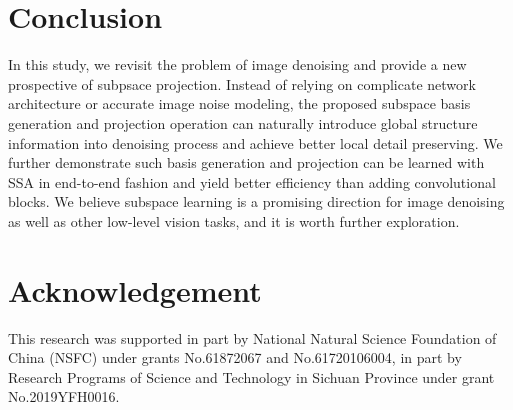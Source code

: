 \documentclass[final]{cvpr}
\begin{document}
\section{Conclusion}
In this study, we revisit the problem of image  denoising and provide a new prospective of subpsace projection. Instead of relying on complicate network architecture or accurate image noise modeling, the proposed subspace basis generation and projection operation can naturally introduce global structure information into denoising process and achieve better local detail preserving. We further demonstrate such basis generation and projection can be learned with SSA in end-to-end fashion and yield better efficiency than adding convolutional blocks. We believe subspace learning is a promising direction for image denoising as well as other low-level vision tasks, and it is worth further exploration. 

\section*{Acknowledgement}
This research was supported in part by National Natural Science Foundation of China (NSFC) under grants No.61872067 and No.61720106004, in part by Research Programs of Science and Technology in Sichuan Province under grant No.2019YFH0016.



\clearpage



\end{document}
